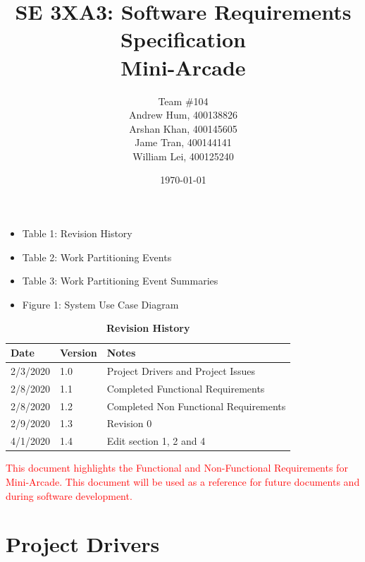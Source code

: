 \documentclass[12pt, titlepage]{article}
\title{SE 3XA3: Software Requirements Specification\\Mini-Arcade}
\author{Team \#104
		\\ Andrew Hum, 400138826
		\\ Arshan Khan, 400145605
		\\ Jame Tran, 400144141
		\\ William Lei, 400125240
}
\date{\today}
\begin{document}
\maketitle

\tableofcontents
\listoftables

\begin{itemize}
\item Table 1: Revision History
\item Table 2: Work Partitioning Events
\item Table 3: Work Partitioning Event Summaries
\end{itemize}

\listoffigures

\begin{itemize}
    \item Figure 1: System Use Case Diagram
\end{itemize}

\begin{table}[bp]
\caption{\bf Revision History}
\begin{tabularx}{\textwidth}{p{3cm}p{2cm}X}
\toprule {\bf Date} & {\bf Version} & {\bf Notes}\\
\midrule
2/3/2020 & 1.0 & Project Drivers and Project Issues\\
2/8/2020 & 1.1 & Completed Functional Requirements\\
2/8/2020 & 1.2 & Completed Non Functional Requirements\\
2/9/2020 & 1.3 & Revision 0\\
4/1/2020 & 1.4 & Edit section 1, 2 and 4\\

\bottomrule
\end{tabularx}
\end{table}

\newpage



\textcolor{red}{This document highlights the Functional and Non-Functional Requirements for Mini-Arcade. This document will be used as a reference for future documents and during software development.}

\section{Project Drivers}
\end{document}
